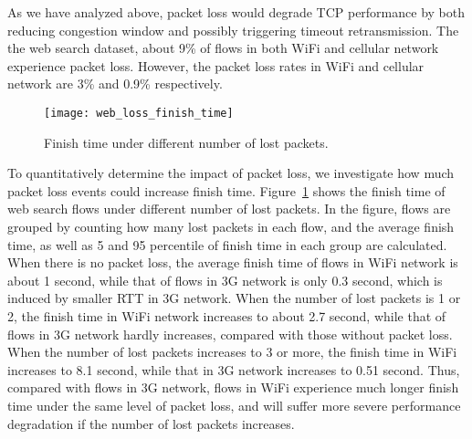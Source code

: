 
As we have analyzed above, packet loss would degrade TCP performance by both reducing congestion window and possibly triggering timeout retransmission. The the web search dataset, about 9\% of flows in both WiFi and cellular network experience packet loss. However, the packet loss rates in WiFi and cellular network are 3\% and 0.9\% respectively.


\begin{figure}[th]
\centering
\texttt{[image: web\_loss\_finish\_time]}
\caption{Finish time under different number of lost packets.}
\label{fig:web_loss_finish_time}
\end{figure}

To quantitatively determine the impact of packet loss, we investigate how much packet loss events could increase finish time. Figure~\ref{fig:web_loss_finish_time} shows the finish time of web search flows under different number of lost packets. In the figure, flows are grouped by counting how many lost packets in each flow, and the average finish time, as well as 5 and 95 percentile of finish time in each group are calculated. When there is no packet loss, the average finish time of flows in WiFi network is about 1 second, while that of flows in 3G network is only 0.3 second, which is induced by smaller RTT in 3G network. When the number of lost packets is 1 or 2, the finish time in WiFi network increases to about 2.7 second, while that of flows in 3G network hardly increases, compared with those without packet loss. When the number of lost packets increases to 3 or more, the finish time in WiFi increases to 8.1 second, while that in 3G network increases to 0.51 second. Thus, compared with flows in 3G network, flows in WiFi experience much longer finish time under the same level of packet loss, and will suffer more severe performance degradation if the number of lost packets increases. 

